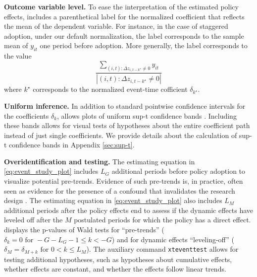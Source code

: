 \documentclass[12pt]{article}
\begin{document}
\noindent \textbf{Outcome variable level.}
To ease the interpretation of the estimated policy effects, \xtevent includes a parenthetical label for the normalized coefficient that reflects the mean of the dependent variable.
For instance, in the case of staggered adoption, under our default normalization, the label corresponds to the sample mean of $y_{it}$ one period before adoption.
More generally, the label corresponds to the value $$\frac{\sum_{(i,t): \Delta z_{i,t-k^{\star}} \neq 0} y_{it}}{ \left| (i,t) : \Delta z_{i,t-k^{\star}} \neq 0 \right| }$$ where $k^{\star}$ corresponds to the normalized event-time cofficient $\delta_{k^{\star}}$.

\begin{sloppypar}
	\noindent \textbf{Uniform inference.}
	In addition to standard pointwise confidence intervals for the coefficients $\delta_k$, \xtevent allows plots of uniform sup-t confidence bands \citep{freyberger2018uniform,montiel2019simultaneous}.
	Including these bands allows for visual tests of hypotheses about the entire coefficient path instead of just single coefficients. We provide details about the calculation of sup-t confidence bands in Appendix \ref{sec:sup-t}.
\end{sloppypar}

\noindent \textbf{Overidentification and testing.}
\label{newcite_pretrends2}
The estimating equation in \eqref{eq:event_study_plot} includes $L_G$ additional periods before policy adoption to visualize potential pre-trends.
Evidence of such pre-trends is, in practice, often seen as evidence for the presence of a confound that invalidates the research design \citep{freyaldenhoven2019pre}.
The estimating equation in \eqref{eq:event_study_plot} also includes $L_M$ additional periods after the policy effects end to assess if the dynamic effects have leveled off after the $M$ postulated periods for which the policy has a direct effect.
\xtevent displays the p-values of Wald tests for ``pre-trends'' ($\delta_k = 0 \text{ for } -G - L_G - 1 \leq k < -G$) and for dynamic effects ``leveling-off'' ($ \delta_M =\delta_{M+k} \text{ for } 0 < k \leq L_M$).
The auxiliary command \texttt{xteventtest} allows for testing additional hypotheses, such as hypotheses about cumulative effects, whether effects are constant, and whether the effects follow linear trends.
\end{document}
